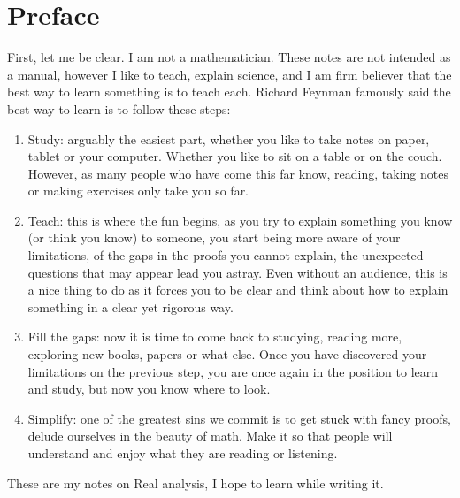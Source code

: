 \chapter{Preface}

First, let me be clear. I am not a mathematician. These notes are not intended as a manual, however I like to teach, explain science, and I am firm believer that the best way to learn something is to teach each. Richard Feynman famously said the best way to learn is to follow these steps:

\begin{enumerate}
    \item Study: arguably the easiest part, whether you like to take notes on paper, tablet or your computer. Whether you like to sit on a table or on the couch. However, as many people who have come this far know, reading, taking notes or making exercises only take you so far.
    \item Teach: this is where the fun begins, as you try to explain something you know (or think you know) to someone, you start being more aware of your limitations, of the gaps in the proofs you cannot explain, the unexpected questions that may appear lead you astray. Even without an audience, this is a nice thing to do as it forces you to be clear and think about how to explain something in a clear yet rigorous way.
    \item Fill the gaps: now it is time to come back to studying, reading more, exploring new books, papers or what else. Once you have discovered your limitations on the previous step, you are once again in the position to learn and study, but now you know where to look.
    \item Simplify: one of the greatest sins we commit is to get stuck with fancy proofs, delude ourselves in the beauty of math. Make it so that people will understand and enjoy what they are reading or listening.
\end{enumerate}

These are my notes on Real analysis, I hope to learn while writing it.